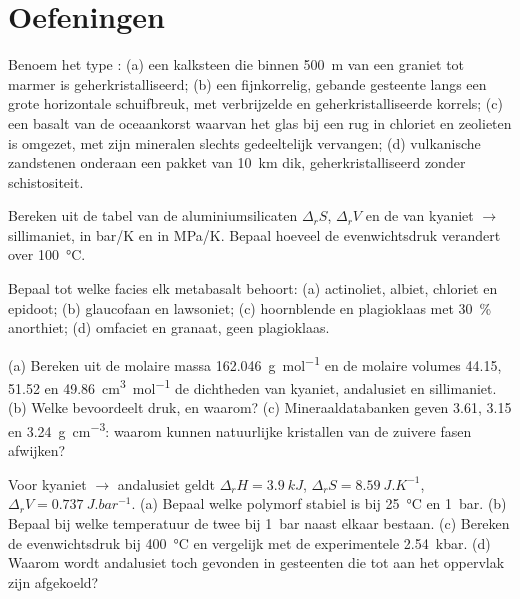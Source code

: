 \section{Oefeningen}

\begin{exercise}[$\star$]\label{exo:b2:metamorphic-facies:1}
Benoem het type : (a) een kalksteen die binnen \qty{500}{m} van een graniet
tot marmer is geherkristalliseerd; (b) een fijnkorrelig, gebande gesteente langs een grote horizontale
schuifbreuk, met verbrijzelde en geherkristalliseerde korrels; (c) een basalt van de oceaankorst waarvan
het glas bij een rug in chloriet en zeolieten is omgezet, met zijn mineralen slechts gedeeltelijk
vervangen; (d) vulkanische zandstenen onderaan een pakket van \qty{10}{km} dik,
geherkristalliseerd zonder schistositeit.
\end{exercise}

\begin{exercise}[$\star$]\label{exo:b2:metamorphic-facies:2}
Bereken uit de tabel van de aluminiumsilicaten $\Delta_r S$, $\Delta_r V$ en de
 van kyaniet $\to$ sillimaniet, in \unit{bar/K} en in \unit{MPa/K}. Bepaal hoeveel
de evenwichtsdruk verandert over \qty{100}{\celsius}.
\end{exercise}

\begin{exercise}[$\star$]\label{exo:b2:metamorphic-facies:3}
Bepaal tot welke facies elk metabasalt behoort: (a) actinoliet, albiet, chloriet en
epidoot; (b) glaucofaan en lawsoniet; (c) hoornblende en plagioklaas met
\qty{30}{\percent} anorthiet; (d) omfaciet en granaat, geen plagioklaas.
\end{exercise}

\begin{exercise}[$\star$]\label{exo:b2:metamorphic-facies:4}
(a) Bereken uit de molaire massa \qty{162.046}{g.mol^{-1}} en de molaire volumes 44.15, 51.52 en
\qty{49.86}{cm^3.mol^{-1}} de dichtheden van kyaniet, andalusiet en sillimaniet.
(b) Welke bevoordeelt druk, en waarom? (c) Mineraaldatabanken geven 3.61, 3.15 en
\qty{3.24}{g.cm^{-3}}: waarom kunnen natuurlijke kristallen van de zuivere fasen afwijken?
\end{exercise}

\begin{exercise}[$\star\star$]\label{exo:b2:metamorphic-facies:5}
Voor kyaniet $\to$ andalusiet geldt $\Delta_r H = \qty{3.9}{kJ}$, $\Delta_r S =
\qty{8.59}{J.K^{-1}}$, $\Delta_r V = \qty{0.737}{J.bar^{-1}}$. (a) Bepaal welke polymorf
stabiel is bij \qty{25}{\celsius} en \qty{1}{bar}. (b) Bepaal bij welke temperatuur de twee
bij \qty{1}{bar} naast elkaar bestaan. (c) Bereken de evenwichtsdruk bij \qty{400}{\celsius} en
vergelijk met de experimentele \qty{2.54}{kbar}. (d) Waarom wordt andalusiet toch
gevonden in gesteenten die tot aan het oppervlak zijn afgekoeld?
\end{exercise}

